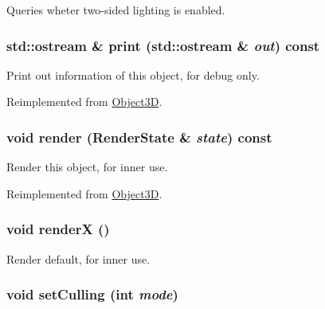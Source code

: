 Queries wheter two-sided lighting is enabled. \hypertarget{classm3g_1_1PolygonMode_6fea17fa1532df3794f8cb39cb4f911f}{
\subsubsection[{print}]{\setlength{\rightskip}{0pt plus 5cm}std::ostream \& print (std::ostream \& {\em out}) const}}
\label{classm3g_1_1PolygonMode_6fea17fa1532df3794f8cb39cb4f911f}


Print out information of this object, for debug only. 

Reimplemented from \hyperlink{classm3g_1_1Object3D_6fea17fa1532df3794f8cb39cb4f911f}{Object3D}.\hypertarget{classm3g_1_1PolygonMode_8babc8a79b78615da51161e94029eea9}{
\subsubsection[{render}]{\setlength{\rightskip}{0pt plus 5cm}void render ({\bf RenderState} \& {\em state}) const}}
\label{classm3g_1_1PolygonMode_8babc8a79b78615da51161e94029eea9}


Render this object, for inner use. 

Reimplemented from \hyperlink{classm3g_1_1Object3D_8babc8a79b78615da51161e94029eea9}{Object3D}.\hypertarget{classm3g_1_1PolygonMode_443a7a301f77f625335ecc06d13bad06}{
\subsubsection[{renderX}]{\setlength{\rightskip}{0pt plus 5cm}void renderX ()}}
\label{classm3g_1_1PolygonMode_443a7a301f77f625335ecc06d13bad06}


Render default, for inner use. \hypertarget{classm3g_1_1PolygonMode_55b3fc23392376c00748d68bdf44ca60}{
\subsubsection[{setCulling}]{\setlength{\rightskip}{0pt plus 5cm}void setCulling (int {\em mode})}}
\label{classm3g_1_1PolygonMode_55b3fc23392376c00748d68bdf44ca60}


